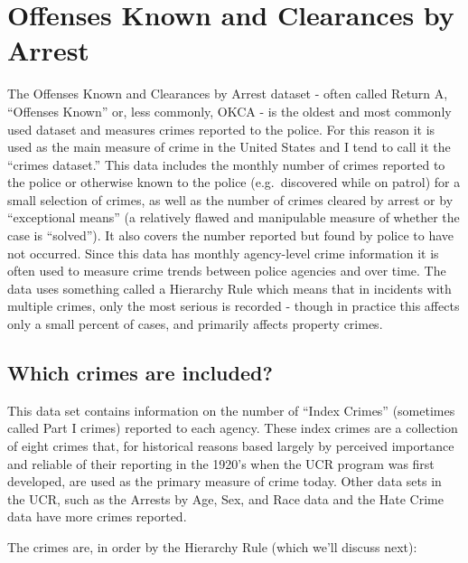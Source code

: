 \documentclass[
  12pt,
  openany]{book}
\begin{document}
\hypertarget{offenses_known}{%
\chapter{Offenses Known and Clearances by Arrest}\label{offenses_known}}

The Offenses Known and Clearances by Arrest dataset - often called Return A, ``Offenses Known'' or, less commonly, OKCA - is the oldest and most commonly used dataset and measures crimes reported to the police. For this reason it is used as the main measure of crime in the United States and I tend to call it the ``crimes dataset.'' This data includes the monthly number of crimes reported to the police or otherwise known to the police (e.g.~discovered while on patrol) for a small selection of crimes, as well as the number of crimes cleared by arrest or by ``exceptional means'' (a relatively flawed and manipulable measure of whether the case is ``solved''). It also covers the number reported but found by police to have not occurred. Since this data has monthly agency-level crime information it is often used to measure crime trends between police agencies and over time. The data uses something called a Hierarchy Rule which means that in incidents with multiple crimes, only the most serious is recorded - though in practice this affects only a small percent of cases, and primarily affects property crimes.

\hypertarget{which-crimes-are-included}{%
\section{Which crimes are included?}\label{which-crimes-are-included}}

This data set contains information on the number of ``Index Crimes'' (sometimes called Part I crimes) reported to each agency. These index crimes are a collection of eight crimes that, for historical reasons based largely by perceived importance and reliable of their reporting in the 1920's when the UCR program was first developed, are used as the primary measure of crime today. Other data sets in the UCR, such as the Arrests by Age, Sex, and Race data and the Hate Crime data have more crimes reported.

The crimes are, in order by the Hierarchy Rule (which we'll discuss next):
\end{document}

